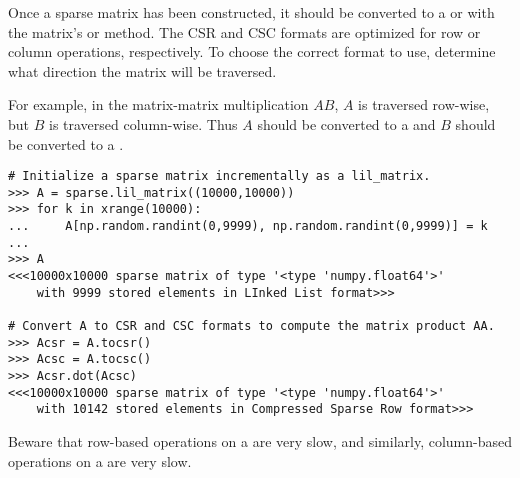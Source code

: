 Once a sparse matrix has been constructed, it should be converted to a  or  with the matrix's  or  method.
The CSR and CSC formats are optimized for row or column operations, respectively.
To choose the correct format to use, determine what direction the matrix will be traversed.%

For example, in the matrix-matrix multiplication $AB$, $A$ is traversed row-wise, but $B$ is traversed column-wise.
Thus $A$ should be converted to a  and $B$ should be converted to a .

\begin{lstlisting}
# Initialize a sparse matrix incrementally as a lil_matrix.
>>> A = sparse.lil_matrix((10000,10000))
>>> for k in xrange(10000):
...     A[np.random.randint(0,9999), np.random.randint(0,9999)] = k
...
>>> A
<<<10000x10000 sparse matrix of type '<type 'numpy.float64'>'
    with 9999 stored elements in LInked List format>>>

# Convert A to CSR and CSC formats to compute the matrix product AA.
>>> Acsr = A.tocsr()
>>> Acsc = A.tocsc()
>>> Acsr.dot(Acsc)
<<<10000x10000 sparse matrix of type '<type 'numpy.float64'>'
    with 10142 stored elements in Compressed Sparse Row format>>>
\end{lstlisting}

Beware that row-based operations on a  are very slow, and similarly, column-based operations on a  are very slow.


